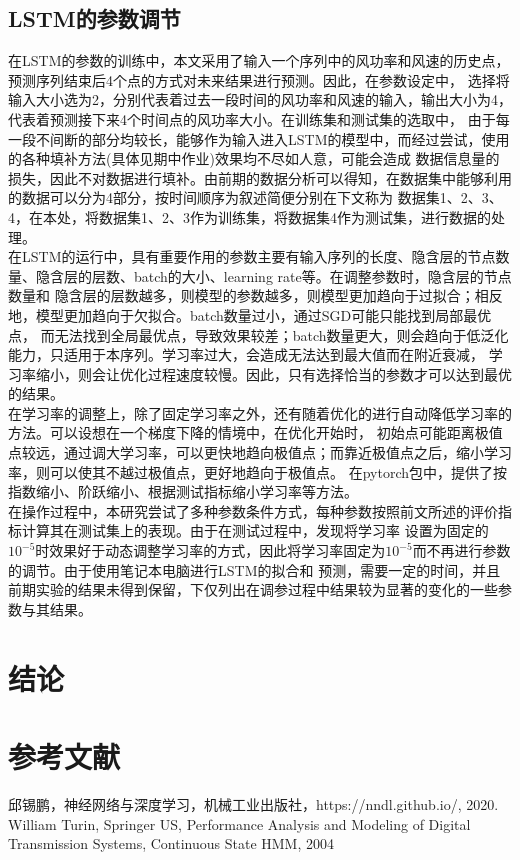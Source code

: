 \documentclass{ctexart}
\begin{document}
\subsection{LSTM的参数调节}
在LSTM的参数的训练中，本文采用了输入一个序列中的风功率和风速的历史点，预测序列结束后4个点的方式对未来结果进行预测。因此，在参数设定中，
选择将输入大小选为2，分别代表着过去一段时间的风功率和风速的输入，输出大小为4，代表着预测接下来4个时间点的风功率大小。在训练集和测试集的选取中，
由于每一段不间断的部分均较长，能够作为输入进入LSTM的模型中，而经过尝试，使用的各种填补方法(具体见期中作业)效果均不尽如人意，可能会造成
数据信息量的损失，因此不对数据进行填补。由前期的数据分析可以得知，在数据集中能够利用的数据可以分为4部分，按时间顺序为叙述简便分别在下文称为
数据集1、2、3、4，在本处，将数据集1、2、3作为训练集，将数据集4作为测试集，进行数据的处理。\\
\indent 在LSTM的运行中，具有重要作用的参数主要有输入序列的长度、隐含层的节点数量、隐含层的层数、batch的大小、learning rate等。在调整参数时，隐含层的节点数量和
隐含层的层数越多，则模型的参数越多，则模型更加趋向于过拟合；相反地，模型更加趋向于欠拟合。batch数量过小，通过SGD可能只能找到局部最优点，
而无法找到全局最优点，导致效果较差；batch数量更大，则会趋向于低泛化能力，只适用于本序列。学习率过大，会造成无法达到最大值而在附近衰减，
学习率缩小，则会让优化过程速度较慢。因此，只有选择恰当的参数才可以达到最优的结果。\\
\indent 在学习率的调整上，除了固定学习率之外，还有随着优化的进行自动降低学习率的方法。可以设想在一个梯度下降的情境中，在优化开始时，
初始点可能距离极值点较远，通过调大学习率，可以更快地趋向极值点；而靠近极值点之后，缩小学习率，则可以使其不越过极值点，更好地趋向于极值点。
在pytorch包中，提供了按指数缩小、阶跃缩小、根据测试指标缩小学习率等方法。\\
\indent 在操作过程中，本研究尝试了多种参数条件方式，每种参数按照前文所述的评价指标计算其在测试集上的表现。由于在测试过程中，发现将学习率
设置为固定的$10^{-5}$时效果好于动态调整学习率的方式，因此将学习率固定为$10^{-5}$而不再进行参数的调节。由于使用笔记本电脑进行LSTM的拟合和
预测，需要一定的时间，并且前期实验的结果未得到保留，下仅列出在调参过程中结果较为显著的变化的一些参数与其结果。

\section{结论}

\section{参考文献}
\noindent [1] 邱锡鹏，神经网络与深度学习，机械工业出版社，https://nndl.github.io/, 2020.\\
\noindent [2] William Turin, Springer US, Performance Analysis and Modeling of Digital Transmission Systems, Continuous State HMM, 2004\\
\noindent [3] 
\end{document}
